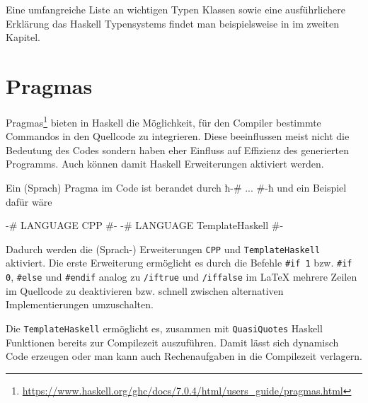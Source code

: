 Eine umfangreiche Liste an wichtigen Typen Klassen sowie eine ausführlichere
Erklärung das Haskell Typensystems findet man beispielsweise in \cite{lyahfgg}
im zweiten Kapitel.

\section{Pragmas} %
Pragmas\footnote{\url{https://www.haskell.org/ghc/docs/7.0.4/html/users_guide/pragmas.html}}
bieten in Haskell die Möglichkeit, für den Compiler bestimmte Commandos in den
Quellcode zu integrieren. Diese beeinflussen meist nicht die Bedeutung des
Codes sondern haben eher Einfluss auf Effizienz des generierten Programms. Auch
können damit Haskell Erweiterungen aktiviert werden.

Ein (Sprach) Pragma im Code ist berandet durch ħ{-# ... #-}ħ und ein Beispiel
dafür wäre
\begin{hcode}
{-# LANGUAGE CPP #-}
{-# LANGUAGE TemplateHaskell #-}
\end{hcode}
Dadurch werden die (Sprach-) Erweiterungen \texttt{CPP} und
\texttt{TemplateHaskell} aktiviert. Die erste Erweiterung ermöglicht es durch
die Befehle \texttt{\#if 1} bzw. \texttt{\#if 0}, \texttt{\#else} und
\texttt{\#endif} analog zu \texttt{\slash{}iftrue} und
\texttt{\slash{}iffalse} im \LaTeX{} mehrere Zeilen im Quellcode zu
deaktivieren bzw. schnell zwischen alternativen Implementierungen umzuschalten.

Die \texttt{TemplateHaskell} ermöglicht es, zusammen mit \texttt{QuasiQuotes}
Haskell Funktionen bereits zur Compilezeit auszuführen. Damit lässt sich
dynamisch Code erzeugen oder man kann auch Rechenaufgaben in die Compilezeit
verlagern.


